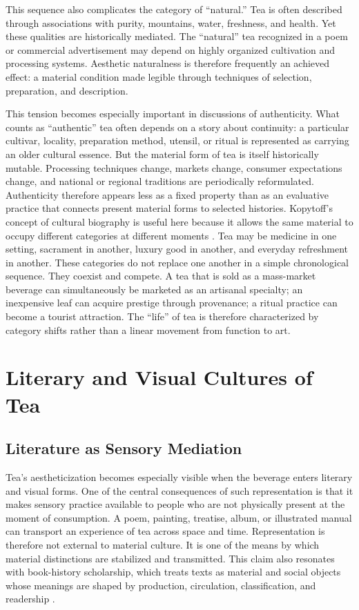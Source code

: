 \documentclass[numbers]{IntechOpen-Book}
\begin{document}
This sequence also complicates the category of ``natural.'' Tea is often described through associations with purity, mountains, water, freshness, and health. Yet these qualities are historically mediated. The ``natural'' tea recognized in a poem or commercial advertisement may depend on highly organized cultivation and processing systems. Aesthetic naturalness is therefore frequently an achieved effect: a material condition made legible through techniques of selection, preparation, and description.

This tension becomes especially important in discussions of authenticity. What counts as ``authentic'' tea often depends on a story about continuity: a particular cultivar, locality, preparation method, utensil, or ritual is represented as carrying an older cultural essence. But the material form of tea is itself historically mutable. Processing techniques change, markets change, consumer expectations change, and national or regional traditions are periodically reformulated. Authenticity therefore appears less as a fixed property than as an evaluative practice that connects present material forms to selected histories. Kopytoff's concept of cultural biography is useful here because it allows the same material to occupy different categories at different moments \cite{kopytoff}. Tea may be medicine in one setting, sacrament in another, luxury good in another, and everyday refreshment in another. These categories do not replace one another in a simple chronological sequence. They coexist and compete. A tea that is sold as a mass-market beverage can simultaneously be marketed as an artisanal specialty; an inexpensive leaf can acquire prestige through provenance; a ritual practice can become a tourist attraction. The ``life'' of tea is therefore characterized by category shifts rather than a linear movement from function to art.

\section{Literary and Visual Cultures of Tea}

\subsection{Literature as Sensory Mediation}

Tea's aestheticization becomes especially visible when the beverage enters literary and visual forms. One of the central consequences of such representation is that it makes sensory practice available to people who are not physically present at the moment of consumption. A poem, painting, treatise, album, or illustrated manual can transport an experience of tea across space and time. Representation is therefore not external to material culture. It is one of the means by which material distinctions are stabilized and transmitted. This claim also resonates with book-history scholarship, which treats texts as material and social objects whose meanings are shaped by production, circulation, classification, and readership \cite{darnton,chartier}.
\end{document}
